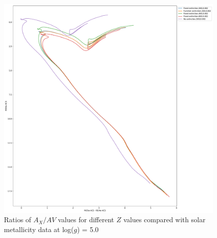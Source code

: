 \documentclass[a4paper, 11pt, oneside]{LJMU_Astro_Thesis}  %
\begin{document}
\begin{figure}[h]
\begin{center}
\includegraphics[scale=0.3]{../basti_isochrones_10_13Gyr/Extinction_T5k_FeH0fix_func_f435wACS_f435wACSmf814wACS_500_400_600_Myr_FeH_0p002_ref_noext_Av_1p0.pdf}
\caption{Ratios of $A_{X}/A{V}$ values for different $Z$ values compared with solar metallicity data at log($g$) = 5.0}
\label{acs_isoc_T5k}
\end{center}
\end{figure}
\end{document}
